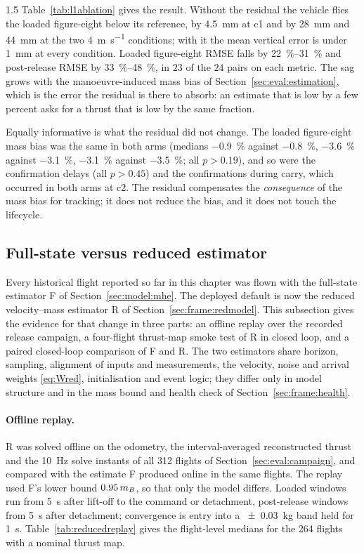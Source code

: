 \begin{spacing}{1.5}
Table~\ref{tab:l1ablation} gives the result. Without the residual the vehicle
flies the loaded figure-eight below its reference, by \SI{4.5}{\milli\meter} at
c1 and by \SI{28}{\milli\meter} and \SI{44}{\milli\meter} at the two
\SI{4}{\meter\per\second} conditions; with it the mean vertical error is under
\SI{1}{\milli\meter} at every condition. Loaded figure-eight RMSE falls by
\SIrange{22}{31}{\percent} and post-release RMSE by \SIrange{33}{48}{\percent},
in $23$ of the $24$ pairs on each metric. The sag grows with the
manoeuvre-induced mass bias of Section~\ref{sec:eval:estimation}, which is the
error the residual is there to absorb: an estimate that is low by a few percent
asks for a thrust that is low by the same fraction.

Equally informative is what the residual did not change. The loaded
figure-eight mass bias was the same in both arms (medians \SI{-0.9}{\percent}
against \SI{-0.8}{\percent}, \SI{-3.6}{\percent} against \SI{-3.1}{\percent},
\SI{-3.1}{\percent} against \SI{-3.5}{\percent}; all $p>0.19$), and so were the
confirmation delays (all $p>0.45$) and the confirmations during carry, which
occurred in both arms at c2. The residual compensates the \emph{consequence} of
the mass bias for tracking; it does not reduce the bias, and it does not touch
the lifecycle.

\subsection{Full-state versus reduced estimator}\label{sec:eval:reduced}

Every historical flight reported so far in this chapter was flown with the
full-state estimator F of Section~\ref{sec:model:mhe}. The deployed default is now the
reduced velocity--mass estimator R of Section~\ref{sec:frame:redmodel}. This
subsection gives the evidence for that change in three parts: an offline replay
over the recorded release campaign, a four-flight thrust-map smoke test of R in
closed loop, and a paired closed-loop comparison of F and R. The two estimators
share horizon, sampling, alignment of inputs and measurements, the velocity,
noise and arrival weights \eqref{eq:Wred}, initialisation and event logic; they
differ only in model structure and in the mass bound and health check of
Section~\ref{sec:frame:health}.

\paragraph{Offline replay.} R was solved offline on the odometry, the
interval-averaged reconstructed thrust and the \SI{10}{\hertz} solve instants of
all 312 flights of Section~\ref{sec:eval:campaign}, and compared with the
estimate F produced online in the same flights. The replay used F's lower bound
$0.95\,m_B$, so that only the model differs. Loaded windows run from
\SI{5}{\second} after lift-off to the command or detachment, post-release windows
from \SI{5}{\second} after detachment; convergence is entry into a
\SI{\pm0.03}{\kg} band held for \SI{1}{\second}.
Table~\ref{tab:reducedreplay} gives the flight-level medians for the 264 flights
with a nominal thrust map.


\end{spacing}

